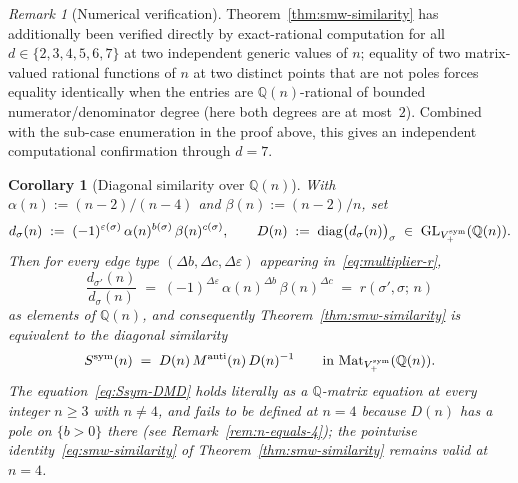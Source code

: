 \documentclass{amsart}
\newtheorem{corollary}[theorem]{Corollary}
\theoremstyle{definition}
\theoremstyle{remark}
\newtheorem{remark}[theorem]{Remark}
\begin{document}
\begin{remark}[Numerical verification]
\label{rem:smw-similarity-numerical}
Theorem~\ref{thm:smw-similarity} has additionally been
verified directly by exact-rational computation for all
$d \in \{2, 3, 4, 5, 6, 7\}$ at two independent generic values
of $n$; equality of two matrix-valued rational functions of $n$
at two distinct points that are not poles forces equality
identically when the entries are $\mathbb{Q}(n)$-rational of
bounded numerator/denominator degree (here both degrees are
at most~$2$).  Combined with the sub-case enumeration in the
proof above, this gives an independent computational
confirmation through $d = 7$.
\end{remark}

\begin{corollary}[Diagonal similarity over $\mathbb Q(n)$]
\label{cor:smw-diagonal}
With $\alpha(n) := (n-2)/(n-4)$ and $\beta(n) := (n-2)/n$,
set
\begin{equation}\label{eq:diag-D}
  d_\sigma(n) \;:=\; (-1)^{\varepsilon(\sigma)}\,
         \alpha(n)^{b(\sigma)}\,\beta(n)^{c(\sigma)},
  \qquad
  D(n) \;:=\; \mathrm{diag}\bigl(d_\sigma(n)\bigr)_{\sigma}
  \;\in\; \mathrm{GL}_{V_+^{\rm sym}}(\mathbb Q(n)).
\end{equation}
Then for every edge type $(\Delta b, \Delta c, \Delta\varepsilon)$
appearing in~\eqref{eq:multiplier-r},
\[
  \frac{d_{\sigma'}(n)}{d_\sigma(n)}
  \;=\; (-1)^{\Delta\varepsilon}\,\alpha(n)^{\Delta b}\,
        \beta(n)^{\Delta c}
  \;=\; r(\sigma', \sigma;\, n)
\]
as elements of $\mathbb Q(n)$, and consequently
Theorem~\ref{thm:smw-similarity} is equivalent to the diagonal
similarity
\begin{equation}\label{eq:Ssym-DMD}
  S^{\rm sym}(n) \;=\; D(n)\, M^{\rm anti}(n)\, D(n)^{-1}
  \qquad \text{in } \mathrm{Mat}_{V_+^{\rm sym}}(\mathbb Q(n)).
\end{equation}
The equation~\eqref{eq:Ssym-DMD} holds literally as a
$\mathbb Q$-matrix equation at every integer $n \ge 3$ with
$n \ne 4$, and fails to be defined at $n = 4$ because $D(n)$
has a pole on $\{b > 0\}$ there
\textup{(}see Remark~\ref{rem:n-equals-4}\textup{)};
the pointwise identity~\eqref{eq:smw-similarity} of
Theorem~\ref{thm:smw-similarity} remains valid at $n = 4$.
\end{corollary}
\end{document}
